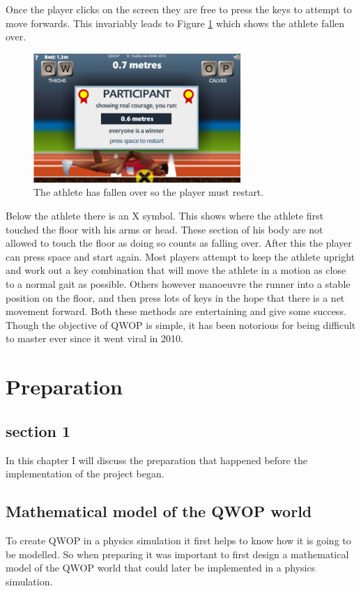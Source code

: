 \documentclass[12pt,a4paper,twoside,openright]{report}
\begin{document}
Once the player clicks on the screen they are free to press the keys to attempt to move forwards. This invariably leads to Figure \ref{fallen} which shows the athlete fallen over. 
\begin{figure}[htbp]
	\centering
	\includegraphics[width=0.7\textwidth]{qwopFallen.PNG}
	\caption{The athlete has fallen over so the player must restart.}
	\label{fallen}
\end{figure}
Below the athlete there is an X symbol. This shows where the athlete first touched the floor with his arms or head. These section of his body are not allowed to touch the floor as doing so counts as falling over. After this the player can press space and start again.
Most players attempt to keep the athlete upright and work out a key combination that will move the athlete in a motion as close to a normal gait as possible.
Others however manoeuvre the runner into a stable position on the floor, and then press lots of keys in the hope that there is a net movement forward.
Both these methods are entertaining and give some success.
Though the objective of QWOP is simple, it has been notorious for being difficult to master ever since it went viral in 2010.




\chapter{Preparation}
\section{section 1}

In this chapter I will discuss the preparation that happened before the implementation of the project began.


\section{Mathematical model of the QWOP world}
\label{mathModel}
To create QWOP in a physics simulation it first helps to know how it is going to be modelled. So when preparing it was important to first design a mathematical model of the QWOP world that could later be implemented in a physics simulation.
\end{document}

